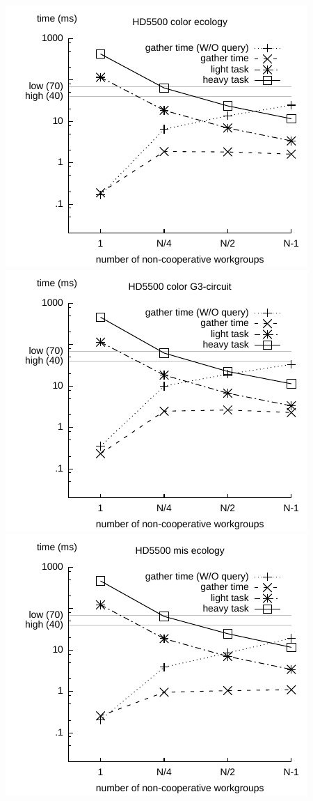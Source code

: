 \documentclass[sigconf]{acmart}
\begin{document}
{\includegraphics[width=.7\columnwidth]{images/barrier/hd5500_color_ecology.pdf} \\
\includegraphics[width=.7\columnwidth]{images/barrier/hd5500_color_G3_circuit.pdf} \\
\includegraphics[width=.7\columnwidth]{images/barrier/hd5500_mis_ecology.pdf} \\
}
\end{document}
